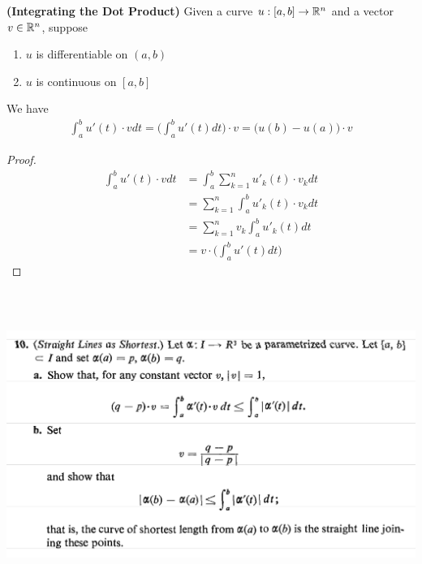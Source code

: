 \documentclass{report}
\begin{document}
\begin{theorem}
\label{IDP}
\textbf{(Integrating the Dot Product)} Given a curve $u:[a,b]\rightarrow \mathbb{R}^n$ and a vector $v \in\mathbb{R}^n$, suppose 
\begin{enumerate}[label=(\alph*)]
  \item $u$ is differentiable on $(a,b)$ 
  \item $u$ is continuous on  $[a,b]$
\end{enumerate}
We have 
\begin{align*}
\int_a^b u'(t)\cdot v dt=
\Big(\int_a^b u'(t)dt \Big)\cdot v= \big(u(b)-u(a) \big)\cdot v
\end{align*}
\end{theorem}
\begin{proof}
\begin{align*}
\int_a^b u'(t)\cdot vdt&=\int_a^b \sum_{k=1}^n u'_k(t)\cdot v_k dt \\
&=\sum_{k=1}^n  \int_a^b u'_k(t)\cdot v_k dt\\
&=\sum_{k=1}^n v_k \int_a^b u'_k(t)dt\\
&=v\cdot \Big(\int_a^b u'(t)dt \Big)
\end{align*}
\end{proof}
\begin{question}{}{}
\includegraphics[height=10cm,width=18cm]{qu5}
\end{question}
\end{document}
